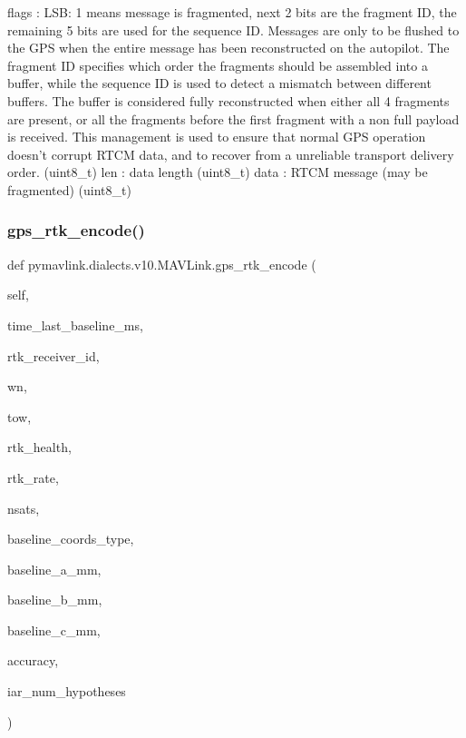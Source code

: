\begin{DoxyVerb}
\begin{DoxyVerb}
\begin{DoxyVerb}
flags                     : LSB: 1 means message is fragmented, next 2 bits are the fragment ID, the remaining 5 bits are used for the sequence ID. Messages are only to be flushed to the GPS when the entire message has been reconstructed on the autopilot. The fragment ID specifies which order the fragments should be assembled into a buffer, while the sequence ID is used to detect a mismatch between different buffers. The buffer is considered fully reconstructed when either all 4 fragments are present, or all the fragments before the first fragment with a non full payload is received. This management is used to ensure that normal GPS operation doesn't corrupt RTCM data, and to recover from a unreliable transport delivery order. (uint8_t)
len                       : data length (uint8_t)
data                      : RTCM message (may be fragmented) (uint8_t)\end{DoxyVerb}
 \mbox{\label{classpymavlink_1_1dialects_1_1v10_1_1MAVLink_a12c9142e6ee3e5ec7c7a52909b1c8336}} 
\subsubsection{\texorpdfstring{gps\+\_\+rtk\+\_\+encode()}{gps\_rtk\_encode()}}
{\footnotesize\ttfamily def pymavlink.\+dialects.\+v10.\+M\+A\+V\+Link.\+gps\+\_\+rtk\+\_\+encode (\begin{DoxyParamCaption}\item[{}]{self,  }\item[{}]{time\+\_\+last\+\_\+baseline\+\_\+ms,  }\item[{}]{rtk\+\_\+receiver\+\_\+id,  }\item[{}]{wn,  }\item[{}]{tow,  }\item[{}]{rtk\+\_\+health,  }\item[{}]{rtk\+\_\+rate,  }\item[{}]{nsats,  }\item[{}]{baseline\+\_\+coords\+\_\+type,  }\item[{}]{baseline\+\_\+a\+\_\+mm,  }\item[{}]{baseline\+\_\+b\+\_\+mm,  }\item[{}]{baseline\+\_\+c\+\_\+mm,  }\item[{}]{accuracy,  }\item[{}]{iar\+\_\+num\+\_\+hypotheses }\end{DoxyParamCaption})}


\end{DoxyVerb}
\end{DoxyVerb}
